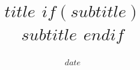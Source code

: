 \title{
  $title$
  $if(subtitle)$
  \\[0.5em] \large $subtitle$
  $endif$
}
\author{} %
\date{$date$}